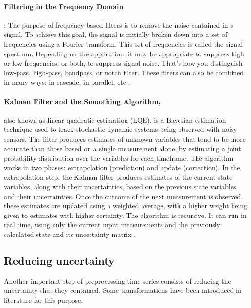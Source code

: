 \paragraph{Filtering in the Frequency Domain}  : The purpose of frequency-based filters is to remove the noise contained in a signal. To achieve this goal, the signal is initially broken down into a set of frequencies using a Fourier transform. This set of frequencies is called the signal spectrum. Depending on the application, it may be appropriate to suppress high or low frequencies, or both, to suppress signal noise. That's how you distinguish low-pass, high-pass, bandpass, or notch filter. These filters can also be combined in many ways: in cascade, in parallel, etc \cite{buttkus2012spectral}.

\paragraph{Kalman Filter and the Smoothing Algorithm,} also known as linear quadratic estimation (LQE), is a Bayesian estimation technique used to track stochastic dynamic systems being observed with noisy sensors. The filter produces estimates of unknown variables that tend to be more accurate than those based on a single measurement alone, by estimating a joint probability distribution over the variables for each timeframe. The algorithm works in two phases: extrapolation (prediction) and update (correction). In the extrapolation step, the Kalman filter produces estimates of the current state variables, along with their uncertainties, based on the previous state variables and their uncertainties. Once the outcome of the next measurement is observed, these estimates are updated using a weighted average, with a higher weight being given to estimates with higher certainty. The algorithm is recursive. It can run in real time, using only the current input measurements and the previously calculated state and its uncertainty matrix \cite{matthies1989kalman}.



\subsection{Reducing uncertainty}
Another important step of preprocessing time series consists of reducing the uncertainty that they contained. Some transformations have been introduced in literature for this purpose.


